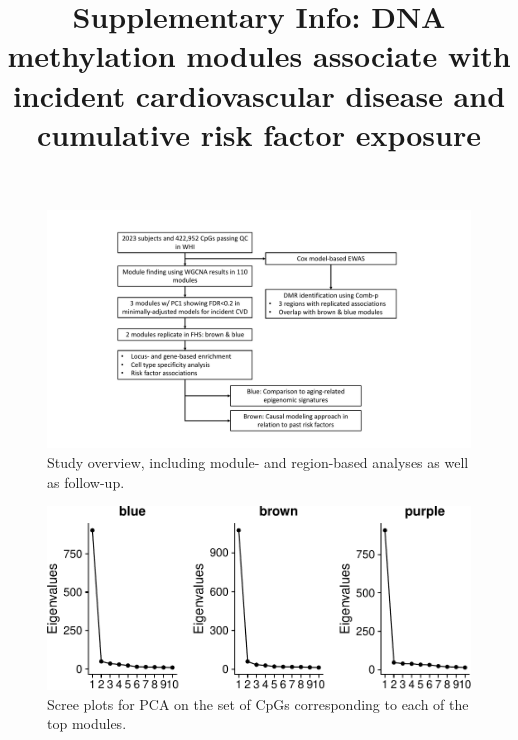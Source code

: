 \documentclass[]{article}
\title{Supplementary Info: DNA methylation modules associate with incident
cardiovascular disease and cumulative risk factor exposure}
\author{}
\date{}
\begin{document}
\maketitle


\newcommand{\beginsupplement}{
  \setcounter{table}{0}  
  \renewcommand{\thetable}{S\arabic{table}} 
  \setcounter{figure}{0} 
  \renewcommand{\thefigure}{S\arabic{figure}}
}

\beginsupplement

\begin{figure}[htbp]
\centering
\includegraphics{../doc/module_ewas/workflow.pdf}
\caption{\label{fig:workflow}Study overview, including module- and
region-based analyses as well as follow-up.}
\end{figure}

\begin{figure}[htbp]
\centering
\includegraphics{../doc/module_ewas/figures/print-scree-plots-1.pdf}
\caption{\label{fig:print-scree-plots}Scree plots for PCA on the set of CpGs
corresponding to each of the top modules.}
\end{figure}
\end{document}
